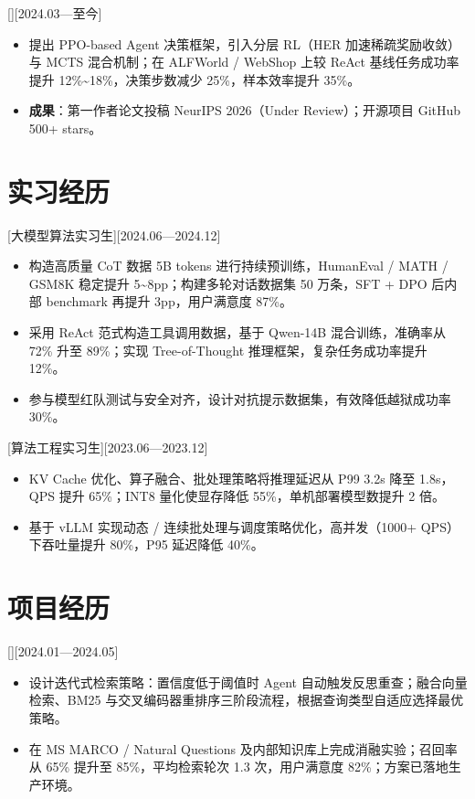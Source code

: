 \documentclass{resume-photo}
\begin{document}
[][2024.03—至今]
\begin{itemize}
  \item 提出 PPO-based Agent 决策框架，引入分层 RL（HER 加速稀疏奖励收敛）与 MCTS 混合机制；在 ALFWorld / WebShop 上较 ReAct 基线任务成功率提升 12\%\textasciitilde18\%，决策步数减少 25\%，样本效率提升 35\%。
  \item \textbf{成果}：第一作者论文投稿 NeurIPS 2026（Under Review）；开源项目 GitHub 500+ stars。
\end{itemize}

\section{实习经历}

[\textnormal{大模型算法实习生}][2024.06—2024.12]
\begin{itemize}
  \item 构造高质量 CoT 数据 5B tokens 进行持续预训练，HumanEval / MATH / GSM8K 稳定提升 5\textasciitilde8pp；构建多轮对话数据集 50 万条，SFT + DPO 后内部 benchmark 再提升 3pp，用户满意度 87\%。
  \item 采用 ReAct 范式构造工具调用数据，基于 Qwen-14B 混合训练，准确率从 72\% 升至 89\%；实现 Tree-of-Thought 推理框架，复杂任务成功率提升 12\%。
  \item 参与模型红队测试与安全对齐，设计对抗提示数据集，有效降低越狱成功率 30\%。
\end{itemize}

[\textnormal{算法工程实习生}][2023.06—2023.12]
\begin{itemize}
  \item KV Cache 优化、算子融合、批处理策略将推理延迟从 P99 3.2s 降至 1.8s，QPS 提升 65\%；INT8 量化使显存降低 55\%，单机部署模型数提升 2 倍。
  \item 基于 vLLM 实现动态 / 连续批处理与调度策略优化，高并发（1000+ QPS）下吞吐量提升 80\%，P95 延迟降低 40\%。
\end{itemize}

\section{项目经历}

[][2024.01—2024.05]
\begin{itemize}
  \item 设计迭代式检索策略：置信度低于阈值时 Agent 自动触发反思重查；融合向量检索、BM25 与交叉编码器重排序三阶段流程，根据查询类型自适应选择最优策略。
  \item 在 MS MARCO / Natural Questions 及内部知识库上完成消融实验；召回率从 65\% 提升至 85\%，平均检索轮次 1.3 次，用户满意度 82\%；方案已落地生产环境。
\end{itemize}
\end{document}

